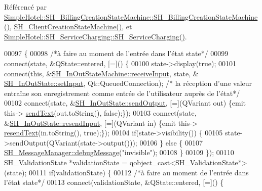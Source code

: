 Référencé par \hyperlink{classSimpleHotel_1_1SH__BillingCreationStateMachine_a8c7d39e11d0ced1fd9c27a5550465b86}{Simple\-Hotel\-::\-S\-H\-\_\-\-Billing\-Creation\-State\-Machine\-::\-S\-H\-\_\-\-Billing\-Creation\-State\-Machine()}, \hyperlink{classSimpleHotel_1_1SH__ClientCreationStateMachine_a301eb77d9ad72102d5fa8952980cf8a3}{S\-H\-\_\-\-Client\-Creation\-State\-Machine()}, et \hyperlink{classSimpleHotel_1_1SH__ServiceCharging_ae82c86c7e955f0dc93cdfc3603789b87}{Simple\-Hotel\-::\-S\-H\-\_\-\-Service\-Charging\-::\-S\-H\-\_\-\-Service\-Charging()}.


\begin{DoxyCode}
00097 \{
00098     \textcolor{comment}{/*à faire au moment de l'entrée dans l'état state*/}
00099     connect(state, &QState::entered, [=]() \{
00100         state->display(\textcolor{keyword}{true});
00101         connect(\textcolor{keyword}{this}, &\hyperlink{classSimpleHotel_1_1SH__InOutStateMachine_a17482446bbf0327e84feb5d6a1a612f0}{SH\_InOutStateMachine::receiveInput}, state, &
      \hyperlink{classSimpleHotel_1_1SH__InOutState_a30d45824ca3c749427ac8d40479cf072}{SH\_InOutState::setInput}, Qt::QueuedConnection); \textcolor{comment}{/* la réception d'une valeur
       entraîne son enregistrement comme entrée de l'utilisateur auprès de l'état*/}
00102         connect(state, &\hyperlink{classSimpleHotel_1_1SH__InOutState_a6f39ba3a9682ece4a0d2c96e8f8983a0}{SH\_InOutState::sendOutput}, [=](QVariant out) \{emit this->
      \hyperlink{classSimpleHotel_1_1SH__InOutStateMachine_ae81d4a51fcd3277ebfc11af978b74c0b}{sendText}(out.toString(), \textcolor{keyword}{false});\});
00103         connect(state, &\hyperlink{classSimpleHotel_1_1SH__InOutState_ab259648430e9e6e0667e79398c68c0d9}{SH\_InOutState::resendInput}, [=](QVariant in) \{emit this->
      \hyperlink{classSimpleHotel_1_1SH__InOutStateMachine_a5db6f59d446182ab9f10e0ccb0399915}{resendText}(in.toString(), \textcolor{keyword}{true});\});
00104         \textcolor{keywordflow}{if}(state->visibility()) \{
00105             state->sendOutput(QVariant(state->output()));
00106         \} \textcolor{keywordflow}{else} \{
00107             \hyperlink{classSimpleHotel_1_1SH__MessageManager_ad680f823897b7bf70e46ee18326c08b2}{SH\_MessageManager::debugMessage}(\textcolor{stringliteral}{"invisible"});
00108         \}
00109     \});
00110     SH\_ValidationState *validationState = qobject\_cast<SH\_ValidationState*>(state);
00111     \textcolor{keywordflow}{if}(validationState) \{
00112         \textcolor{comment}{/*à faire au moment de l'entrée dans l'état state*/}
00113         connect(validationState, &QState::entered, [=]() \{

\end{DoxyCode}
